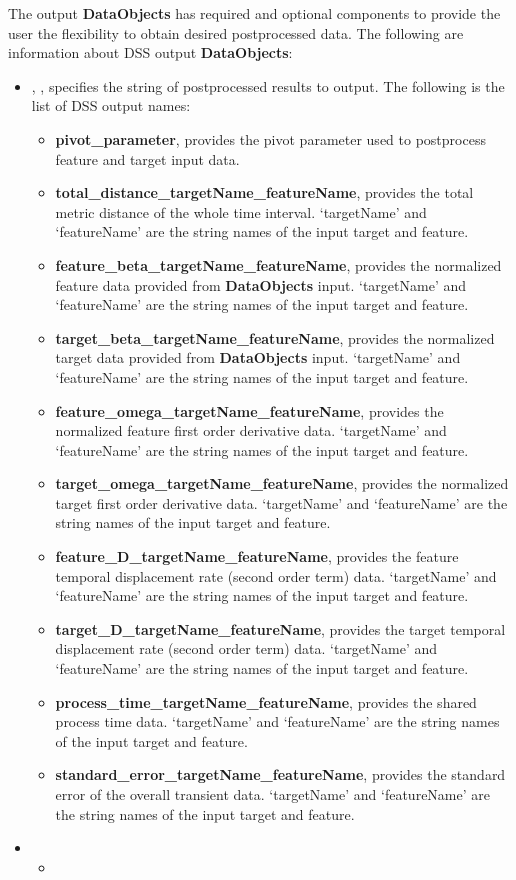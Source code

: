 The output \textbf{DataObjects} has required and optional components to provide the user the flexibility to obtain desired postprocessed data. The following are information about DSS output \textbf{DataObjects}:
\begin{itemize}
  \item {}, , specifies the string of postprocessed results to output. The following is the list of DSS output names:
    \begin{itemize}
      \item \textbf{pivot\_parameter}, provides the pivot parameter used to postprocess feature and target input data.
      \item \textbf{total\_distance\_targetName\_featureName}, provides the total metric distance of the whole time interval. `targetName' and `featureName' are the string names of the input target and feature.
      \item \textbf{feature\_beta\_targetName\_featureName}, provides the normalized feature data provided from \textbf{DataObjects} input.  `targetName' and `featureName' are the string names of the input target and feature.
      \item \textbf{target\_beta\_targetName\_featureName}, provides the normalized target data provided from \textbf{DataObjects} input.  `targetName' and `featureName' are the string names of the input target and feature.
      \item \textbf{feature\_omega\_targetName\_featureName}, provides the normalized feature first order derivative data.  `targetName' and `featureName' are the string names of the input target and feature.
      \item \textbf{target\_omega\_targetName\_featureName}, provides the normalized target first order derivative data.  `targetName' and `featureName' are the string names of the input target and feature.
      \item \textbf{feature\_D\_targetName\_featureName}, provides the feature temporal displacement rate (second order term) data.  `targetName' and `featureName' are the string names of the input target and feature.
      \item \textbf{target\_D\_targetName\_featureName}, provides the target temporal displacement rate (second order term) data.  `targetName' and `featureName' are the string names of the input target and feature.
      \item \textbf{process\_time\_targetName\_featureName}, provides the shared process time data.  `targetName' and `featureName' are the string names of the input target and feature.
      \item \textbf{standard\_error\_targetName\_featureName}, provides the standard error of the overall transient data.  `targetName' and `featureName' are the string names of the input target and feature.
    \end{itemize}
  \item {}
  \begin{itemize}
    \item {}
  \end{itemize}
\end{itemize}
